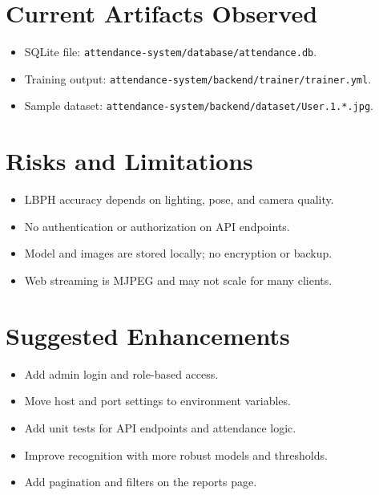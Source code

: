 \documentclass[11pt]{article}
\begin{document}
\section*{Current Artifacts Observed}
\begin{itemize}[leftmargin=*]
  \item SQLite file: \texttt{attendance-system/database/attendance.db}.
  \item Training output: \texttt{attendance-system/backend/trainer/trainer.yml}.
  \item Sample dataset: \texttt{attendance-system/backend/dataset/User.1.*.jpg}.
\end{itemize}

\section*{Risks and Limitations}
\begin{itemize}[leftmargin=*]
  \item LBPH accuracy depends on lighting, pose, and camera quality.
  \item No authentication or authorization on API endpoints.
  \item Model and images are stored locally; no encryption or backup.
  \item Web streaming is MJPEG and may not scale for many clients.
\end{itemize}

\section*{Suggested Enhancements}
\begin{itemize}[leftmargin=*]
  \item Add admin login and role-based access.
  \item Move host and port settings to environment variables.
  \item Add unit tests for API endpoints and attendance logic.
  \item Improve recognition with more robust models and thresholds.
  \item Add pagination and filters on the reports page.
\end{itemize}
\end{document}
